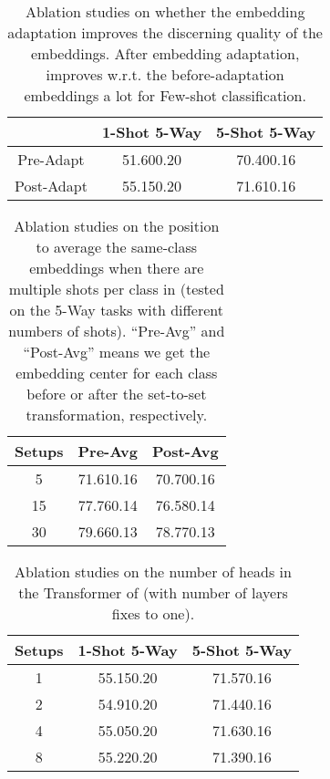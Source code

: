 \begin{table}[tbp]
	\small
	\tabcolsep 5pt
	\centering
	\caption{Ablation studies on whether the embedding adaptation improves the discerning quality of the embeddings. After embedding adaptation, \feat improves w.r.t. the before-adaptation embeddings a lot for Few-shot classification.}
	\begin{tabular}{@{\;}ccc@{\;}}
		\addlinespace
		\toprule
		& 1-Shot 5-Way   & 5-Shot 5-Way \\
		\midrule
		Pre-Adapt    & 51.60{\tiny  0.20}  & 70.40{\tiny  0.16} \\
		Post-Adapt  & 55.15{\tiny  0.20}  & 71.61{\tiny  0.16} \\
		\bottomrule
	\end{tabular}
	\label{supp-tab:adapt_ablation}
\end{table}

\begin{table}[tbp]
	\small
	\tabcolsep 5pt
	\centering
	\caption{Ablation studies on the position to average the same-class embeddings when there are multiple shots per class in {\feat} (tested on the 5-Way tasks with different numbers of shots). ``Pre-Avg'' and ``Post-Avg'' means we get the embedding center for each class before or after the set-to-set transformation, respectively.}
	\begin{tabular}{@{\;}ccc@{\;}}
		\addlinespace
		\toprule
		Setups  & Pre-Avg & Post-Avg \\
		\midrule
		5     & 71.61{\tiny  0.16} & 70.70{\tiny  0.16}  \\
		15     & 77.76{\tiny  0.14} & 76.58{\tiny  0.14} \\
		30     & 79.66{\tiny  0.13} & 78.77{\tiny  0.13} \\
		\bottomrule
	\end{tabular}
	\label{supp-tab:shot_change}
\end{table}

\begin{table}[tbp]
	\small
	\tabcolsep 5pt
	\centering
	\caption{Ablation studies on the number of heads in the Transformer of {\feat} (with number of layers fixes to one).}
	\begin{tabular}{@{\;}ccc@{\;}}
		\addlinespace
		\toprule
		Setups  & 1-Shot 5-Way & 5-Shot 5-Way \\
		\midrule
		1     & 55.15{\tiny  0.20} & 71.57{\tiny  0.16}  \\
		2     & 54.91{\tiny  0.20} & 71.44{\tiny  0.16} \\
		4     & 55.05{\tiny  0.20} & 71.63{\tiny  0.16} \\
		8     & 55.22{\tiny  0.20} & 71.39{\tiny  0.16} \\
		\bottomrule
	\end{tabular}
	\label{supp-tab:component_head}
\end{table}

